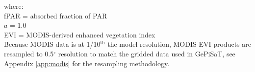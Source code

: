 \noindent where: \\
\indent fPAR = absorbed fraction of PAR\\
\indent $a$ = 1.0 \\
\indent EVI = MODIS-derived enhanced vegetation index \\

Because MODIS data is at 1/10$^{\text{th}}$ the model resolution, MODIS EVI products are resampled to 0.5$^{\circ}$ resolution to match the gridded data used in GePiSaT, see Appendix \ref{app:modis} for the resampling methodology.
